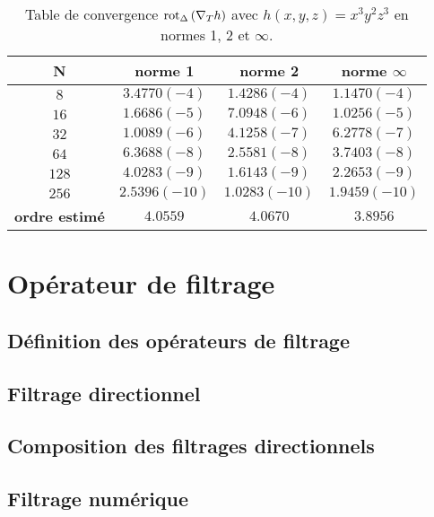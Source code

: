 \begin{table}[htbp]
\begin{center}
\begin{tabular}{|c||c|c|c|}
\hline
\textbf{N}  & \textbf{norme 1} & \textbf{norme 2} & \textbf{norme $\infty$} \\
\hline
\hline
$8$  & $3.4770(-4)$  & $1.4286(-4)$  & $1.1470(-4)$  \\
$16$ & $1.6686(-5)$  & $7.0948(-6)$  & $1.0256(-5)$  \\
$32$ & $1.0089(-6)$  & $4.1258(-7)$  & $6.2778(-7)$  \\
$64$ & $6.3688(-8)$  & $2.5581(-8)$  & $3.7403(-8)$  \\
$128$& $4.0283(-9)$  & $1.6143(-9)$  & $2.2653(-9)$  \\
$256$& $2.5396(-10)$ & $1.0283(-10)$ & $1.9459(-10)$ \\
\hline 
\hline
\textbf{ordre estimé}& $4.0559$ & $4.0670$ & $3.8956$\\
\hline
\end{tabular}
\end{center}
\caption{Table de convergence $\text{rot}_{\Delta} \left(\nabla_T h \right)$ avec $ h(x,y,z)=x^3 y^2 z^3$ en normes 1, 2 et $\infty$.}
\label{tab:rate_rotgrad}
\end{table} 


















\section{Opérateur de filtrage}

\subsection{Définition des opérateurs de filtrage}

\subsection{Filtrage directionnel}

\subsection{Composition des filtrages directionnels}

\subsection{Filtrage numérique}
